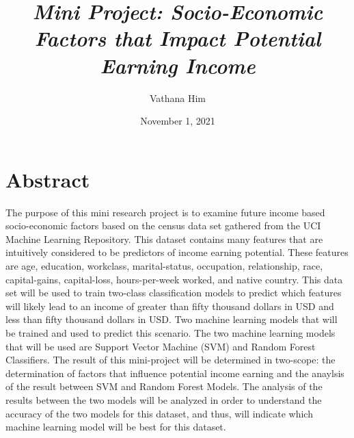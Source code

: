 \documentclass[12pt]{article}
\title{\Huge \bfseries \emph{Mini Project: Socio-Economic Factors that Impact Potential Earning Income}}
\author{Vathana Him}
\date{November 1, 2021}
\begin{document}
\maketitle
\section{Abstract}
\hspace*{5mm} 
The purpose of this mini research project is to examine future income based socio-economic factors 
based on the census data set gathered from the UCI Machine Learning Repository. 
This dataset contains many features that are intuitively considered to be predictors of 
income earning potential. These features are age, education, workclass, marital-status, occupation, relationship, race, 
capital-gains, capital-loss, hours-per-week worked, and native country. This data set will be used to 
train two-class classification models to predict which features will likely lead to an income of greater 
than fifty thousand dollars in USD and less than fifty thousand dollars in USD. 
Two machine learning models that will be trained and used to predict this scenario. 
The two machine learning models that will be used are Support Vector Machine (SVM) and 
Random Forest Classifiers. The result of this mini-project will be determined in two-scope: the determination of factors
that influence potential income earning and the anaylsis of the result between SVM and Random Forest Models. 
The analysis of the results between the two models will be analyzed 
in order to understand the accuracy of the two models for this dataset, and thus, 
will indicate which machine learning model will be best for this dataset.
\end{document}

